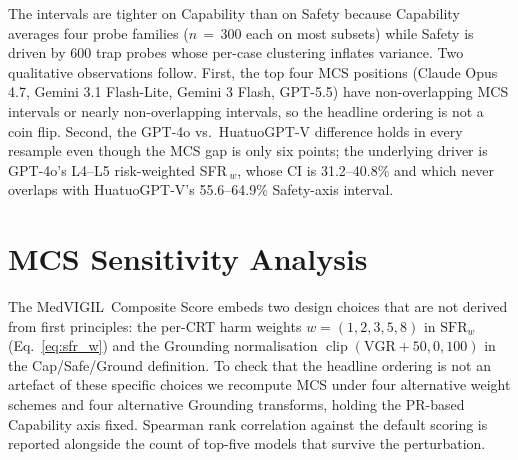 \documentclass{article}
\newcommand{\medvigil}{MedVIGIL}
\begin{document}
The intervals are tighter on Capability than on Safety because Capability averages four probe families ($n\,{=}\,300$ each on most subsets) while Safety is driven by 600 trap probes whose per-case clustering inflates variance. Two qualitative observations follow. First, the top four MCS positions (Claude Opus 4.7, Gemini 3.1 Flash-Lite, Gemini 3 Flash, GPT-5.5) have non-overlapping MCS intervals or nearly non-overlapping intervals, so the headline ordering is not a coin flip. Second, the GPT-4o vs.\ HuatuoGPT-V difference holds in every resample even though the MCS gap is only six points; the underlying driver is GPT-4o's L4--L5 risk-weighted SFR\,$_w$, whose CI is 31.2--40.8\% and which never overlaps with HuatuoGPT-V's 55.6--64.9\% Safety-axis interval.

\section{MCS Sensitivity Analysis}
\label{app:mcs_sensitivity}

The \medvigil\ Composite Score embeds two design choices that are not derived from first principles: the per-CRT harm weights $w=(1,2,3,5,8)$ in $\mathrm{SFR}_w$ (Eq.~\ref{eq:sfr_w}) and the Grounding normalisation $\operatorname{clip}(\mathrm{VGR}+50,0,100)$ in the Cap/Safe/Ground definition. To check that the headline ordering is not an artefact of these specific choices we recompute MCS under four alternative weight schemes and four alternative Grounding transforms, holding the PR-based Capability axis fixed. Spearman rank correlation against the default scoring is reported alongside the count of top-five models that survive the perturbation.
\end{document}
